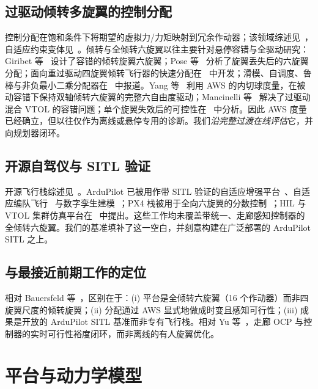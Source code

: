 \documentclass[UTF8,a4paper,11pt]{ctexart}
\begin{document}
\subsection{过驱动倾转多旋翼的控制分配}
控制分配在饱和条件下将期望的虚拟力/力矩映射到冗余作动器；该领域综述见~\cite{johansen2013survey,blaha2023survey}，自适应约束变体见~\cite{tohidi2020adaptive}。倾转与全倾转六旋翼以往主要针对悬停容错与全驱动研究：Giribet 等~\cite{giribet2016tilted} 设计了容错的倾转旋翼六旋翼；Pose 等~\cite{pose2017hexacopter} 分析了旋翼丢失后的六旋翼分配；面向重过驱动四旋翼倾转飞行器的快速分配在~\cite{santos2021fast} 中开发；滑模、自调度、鲁棒与非负最小二乘分配器在~\cite{nguyen2022smc,nguyen2018selfscheduled,baldini2023ftc,zheng2026safety} 中报道。Yang 等~\cite{yang2026biaxial} 利用 AWS 的内切球度量，在被动容错下保持双轴倾转六旋翼的完整六自由度驱动；Mancinelli 等~\cite{mancinelli2025ftc} 解决了过驱动混合 VTOL 的容错问题；单个旋翼失效后的可控性在~\cite{du2015controllability} 中分析。因此 AWS 度量已经确立，但以往仅作为离线或悬停专用的诊断。我们\emph{沿完整过渡在线评估}它，并向规划器闭环。

\subsection{开源自驾仪与 SITL 验证}
开源飞行栈综述见~\cite{aliane2024opensource}。ArduPilot 已被用作带 SITL 验证的自适应增强平台~\cite{baldi2022ardupilot}、自适应编队飞行~\cite{yang2019formation} 与数字孪生建模~\cite{valencia2025digitaltwin}；PX4 栈被用于全向六旋翼的分数控制~\cite{deoca2025fractional}；HIL 与 VTOL 集群仿真平台在~\cite{dai2021rflysim,sethi2022swarm} 中提出。这些工作均未覆盖带统一、走廊感知控制器的全倾转六旋翼。我们的基准填补了这一空白，并刻意构建在广泛部署的 ArduPilot SITL 之上。

\subsection{与最接近前期工作的定位}
相对 Bauersfeld 等~\cite{bauersfeld2021mpc}，区别在于：(i) 平台是全倾转六旋翼（16 个作动器）而非四旋翼尺度的倾转旋翼；(ii) 分配通过 AWS 显式地做成时变且感知可行性；(iii) 成果是开放的 ArduPilot SITL 基准而非专有飞行栈。相对 Yu 等~\cite{yu2022pilot}，走廊 OCP 与控制器的实时可行性裕度闭环，而非离线的有人旋翼优化。

\section{平台与动力学模型}\label{sec:model}
\end{document}
